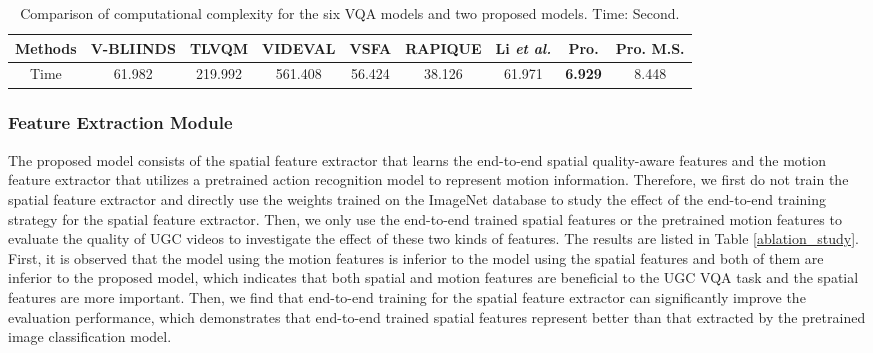 \documentclass[sigconf]{acmart}
\begin{document}
\begin{table*}
\centering
\renewcommand{\arraystretch}{1}
\caption{Comparison of computational complexity for the six VQA models and two proposed models. Time: Second.}
\label{computationsl_complexity}
\begin{tabular}{c|cccccccc}
\toprule[.15em]
 Methods & V-BLIINDS & TLVQM & VIDEVAL & VSFA& RAPIQUE & Li \textit{et al.} & Pro. & Pro. M.S. \\
\hline
Time & 61.982  & 219.992   & 561.408  &56.424  & 38.126  & 61.971 & \textbf{6.929}  & 8.448  \\
\bottomrule[.15em]
\end{tabular}
\end{table*}




\subsubsection{Feature Extraction Module}
The proposed model consists of the spatial feature extractor that learns the end-to-end spatial quality-aware features and the motion feature extractor that utilizes a pretrained action recognition model to represent motion information. 
Therefore, we first do not train the spatial feature extractor and directly use the weights trained on the ImageNet database to study the effect of the end-to-end training strategy for the spatial feature extractor. Then, we only use the end-to-end trained spatial features or the pretrained motion features to evaluate the quality of UGC videos to investigate the effect of these two kinds of features. The results are listed in Table \ref{ablation_study}. First, it is observed that the model using the motion features is inferior to the model using the spatial features and both of them are inferior to the proposed model, which indicates that both spatial and motion features are beneficial to the UGC VQA task and the spatial features are more important. Then, we find that end-to-end training for the spatial feature extractor can significantly improve the evaluation performance, which demonstrates that end-to-end trained spatial features represent better than that extracted by the pretrained image classification model.  
\end{document}
